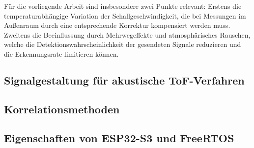 Für die vorliegende Arbeit sind insbesondere zwei Punkte relevant: Erstens die temperaturabhängige Variation der Schallgeschwindigkeit, die bei Messungen im Außenraum durch eine entsprechende Korrektur kompensiert werden muss. Zweitens die Beeinflussung durch Mehrwegeffekte und atmosphärisches Rauschen, welche die Detektionswahrscheinlichkeit der gesendeten Signale reduzieren und die Erkennungsrate limitieren können.


\subsection{Signalgestaltung für akustische ToF-Verfahren}

\subsection{Korrelationsmethoden}


\subsection{Eigenschaften von ESP32-S3 und FreeRTOS}

